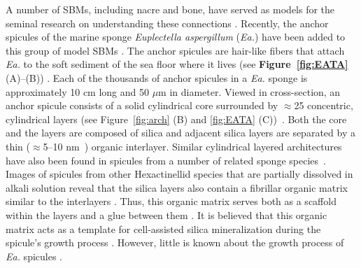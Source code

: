 \documentclass[12pt,onecolumn]{article}
\makeatletter
\newcommand{\EA}{\textit{Ea.\@}\xspace}
\makeatother
\begin{document}
A number of SBMs, including nacre and bone, have served as models for the seminal research on understanding these connections \cite{jackson1988,currey1977}. Recently, the anchor spicules of the marine sponge \textit{Euplectella aspergillum} (\EA) have been added to this group of model SBMs \cite{mayer2005rigid,mayer2011new,kolednik2011bioinspired,walter2007mechanisms}. The anchor spicules are hair-like fibers that attach \EA to the soft sediment of the sea floor where it lives (see {\bf Figure~\ref{fig:EATA}} (A)--(B)) \cite{weaver2007hierarchical}. Each of the thousands of anchor spicules in a \EA sponge is approximately 10 cm long and 50 $\mu$m in diameter. Viewed in cross-section, an anchor spicule consists of a solid cylindrical core surrounded by $\approx$25 concentric, cylindrical layers (see Figure~\ref{fig:arch} (B) and \ref{fig:EATA} (C))~\cite{aizenberg2005skeleton,weaver2007hierarchical,monn2015new}. Both the core and the layers are composed of silica and adjacent silica layers are separated by a thin ($\approx$5--10 nm~\cite{weaver2007hierarchical}) organic interlayer.
Similar cylindrical layered architectures have also been found in spicules from a number of related sponge species~\cite{sarikaya2001biomimetic,weaver2010unifying,levi1989remarkably,wang2010silica}. Images of spicules from other Hexactinellid species that are partially dissolved in alkali solution reveal that the silica layers also contain a fibrillar organic matrix similar to the interlayers \cite{ehrlich2006modern, ehrlich2008nanostructural, ehrlich2010mineralization}. Thus, this organic matrix serves both as a scaffold within the layers and a glue between them \cite{ehrlich2016supercontinuum}. 
%
%
It is believed that this organic matrix acts as a template for cell-assisted silica mineralization during the spicule's growth process \cite{ehrlich2006modern, ehrlich2008nanostructural, ehrlich2010mineralization, wysokowski2018biosilica}. However, little is known about the growth process of \EA spicules \cite{wysokowski2018biosilica}.
%
\end{document}
